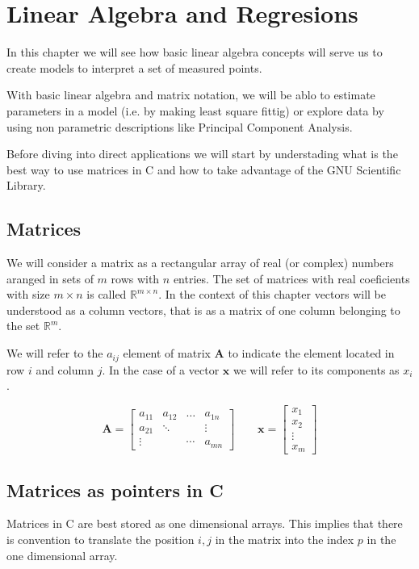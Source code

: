 \documentclass{article}
\newcommand{\real}{\mathbb{R}}
\begin{document}
\setcounter{section}{3}
\section{Linear Algebra and Regresions}
In this chapter we will see how basic linear algebra concepts will serve us to create models to interpret a set of measured points.

With basic linear algebra and matrix notation, we will be ablo to estimate parameters in a model (i.e. by making least square fittig) or explore data by using non parametric descriptions like Principal Component Analysis.

Before diving into direct applications we will start by 
understading what is the best way to use matrices in C and how to take advantage of the GNU Scientific Library.


\subsection{Matrices}
We will consider a matrix as a rectangular array of real (or complex) numbers aranged in sets of $m$ rows with $n$ entries. The set of matrices with real coeficients with size $m\times n$ is called $\real^{m\times n}$. In the context of this chapter vectors will be understood as a column vectors, that is as a matrix of one column belonging to the set $\real^{m}$. 

We will refer to the $a_{ij}$ element of matrix ${\mathbf A}$ to indicate the element located in row $i$ and column $j$. In the case of a vector ${\mathbf x}$ we will refer to its components as $x_{i}$.


\begin{displaymath}
\mathbf{A} = 
\left[
\begin{array}{cccc}
a_{11}  & a_{12}  & \dots & a_{1n}   \\
a_{21}  &  \ddots &  & \vdots  \\
\vdots  &  & \cdots & a_{mn}   
\end{array}
\right]
\qquad
\mathbf{x} = 
\left[
\begin{array}{c}
x_{1}     \\
x_2          \\
\vdots     \\
x_{m}   
\end{array}
\right]
\end{displaymath}


\subsection{Matrices as pointers in C}
Matrices in C are best stored as one dimensional arrays. This implies that there is convention to translate the position $i,j$ in the matrix into the index $p$ in the one dimensional array. 
\end{document}
